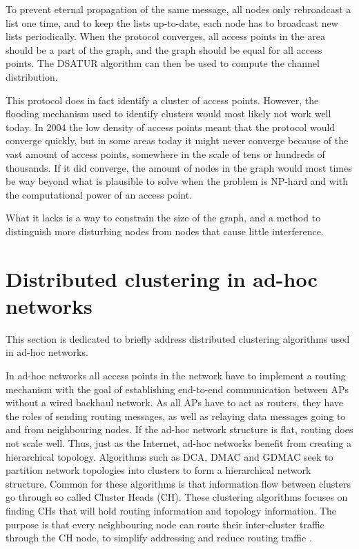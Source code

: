 To prevent eternal propagation of the same message, all nodes only rebroadcast a list one time, and to keep the lists up-to-date, each node has to broadcast new
lists periodically. When the protocol converges, all access points in the area should be a part of the graph, and the graph should be equal for all access points. The DSATUR algorithm can then be used to compute the channel distribution.

This protocol does in fact identify a cluster of access points. However, the flooding mechanism used to identify clusters
would most likely not work well today. In 2004 the low density of access points meant that the protocol would converge quickly, but in some areas today it might never converge because
of the vast amount of access points, somewhere in the scale of tens or hundreds of thousands. If it did converge, the amount of nodes in the graph would most times be way beyond what is plausible to solve when the problem is NP-hard and with the computational power of an access point. 

What it lacks is a way to constrain the size of the graph, and a method to distinguish more disturbing nodes from nodes that cause little interference.

%
\section{Distributed clustering in ad-hoc networks}
This section is dedicated to briefly address distributed clustering algorithms used in ad-hoc networks.

In ad-hoc networks all access points in the network have to implement a routing mechanism with the goal of establishing end-to-end communication 
between APs without a wired backhaul network. As all APs have to act as routers, they have the roles of sending routing messages, as well as relaying data messages
going to and from neighbouring nodes. If the ad-hoc network structure is flat, routing does not scale well. Thus, just as the Internet, ad-hoc networks benefit
from creating a hierarchical topology. Algorithms such as DCA, DMAC  and GDMAC \cite{Basagni} seek to partition network topologies into clusters to form a hierarchical network structure.
Common for these algorithms is that information flow between clusters go through so called Cluster Heads (CH). These clustering algorithms focuses on finding CHs that will hold routing information and topology information. The purpose is that every neighbouring node can route their inter-cluster traffic through the CH node, to simplify addressing and reduce routing traffic \cite{Mamalis}.

